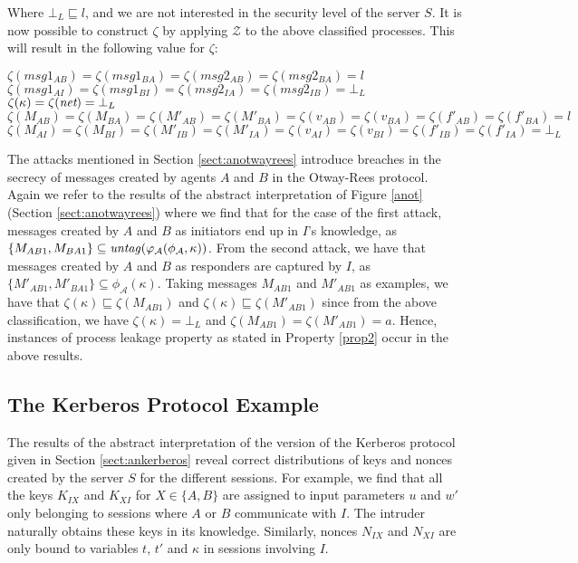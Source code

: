 \documentclass[10pt,a4paper,final,oneside,fleqn]{book}
\begin{document}
\noindent
Where $\bot_L\sqsubseteq l$, and we are not interested in the security level of the server $S$. It is now possible to construct $\zeta$ by applying $\mathcal{Z}$ to the above classified processes.  This will result in the following value for $\zeta$:\vspace{6mm}

\noindent $\zeta(msg1_{AB})=\zeta(msg1_{BA})=\zeta(msg2_{AB})=\zeta(msg2_{BA})=l$\\
$\zeta(msg1_{AI})=\zeta(msg1_{BI})=\zeta(msg2_{IA})=\zeta(msg2_{IB})=\bot_L$\\
$\zeta(\kappa)=\zeta(\mbox{{\itshape net}})=\bot_L$\\
$\zeta(M_{AB})=\zeta(M_{BA})=\zeta(M'_{AB})=\zeta(M'_{BA})=\zeta(v_{AB})=\zeta(v_{BA})=\zeta(f'_{AB})=\zeta(f'_{BA})=l$\\
$\zeta(M_{AI})=\zeta(M_{BI})=\zeta(M'_{IB})=\zeta(M'_{IA})=\zeta(v_{AI})=\zeta(v_{BI})=\zeta(f'_{IB})=\zeta(f'_{IA})=\bot_L$\vspace{6mm}

\noindent
The attacks mentioned in Section \ref{sect:anotwayrees} introduce breaches in the secrecy of messages created by agents $A$ and $B$ in the Otway-Rees protocol.  Again we refer to the results of the abstract interpretation of Figure \ref{anot} (Section \ref{sect:anotwayrees}) where we find that for the case of the first attack, messages created by $A$ and $B$ as initiators end up in $I$'s knowledge, as $\{M_{AB1},M_{BA1}\}\subseteq\mbox{{\itshape untag\/}}(\varphi_\mathcal{A}(\phi_\mathcal{A},\kappa))$. From the second attack, we have that messages created by $A$ and $B$ as responders are captured by $I$, as $\{M'_{AB1},M'_{BA1}\}\subseteq\phi_\mathcal{A}(\kappa)$.  Taking messages $M_{AB1}$ and $M'_{AB1}$ as examples, we have that $\zeta(\kappa)\sqsubseteq\zeta(M_{AB1})$ and $\zeta(\kappa)\sqsubseteq\zeta(M'_{AB1})$ since from the above classification, we have $\zeta(\kappa)=\bot_L$ and $\zeta(M_{AB1})=\zeta(M'_{AB1})=a$.  Hence, instances of process leakage property as stated in Property \ref{prop2} occur in the above results.
\subsection{The Kerberos Protocol Example}
The results of the abstract interpretation of the version of the Kerberos protocol given in Section \ref{sect:ankerberos} reveal correct distributions of keys and nonces created by the server $S$ for the different sessions.  For example, we find that all the keys $K_{IX}$ and $K_{XI}$ for $X\in\{A,B\}$ are assigned to input parameters $u$ and $w'$ only belonging to sessions where $A$ or $B$ communicate with $I$.  The intruder naturally obtains these keys in its knowledge.  Similarly, nonces $N_{IX}$ and $N_{XI}$ are only bound to variables $t$, $t'$ and $\kappa$ in sessions involving $I$.
\end{document}
